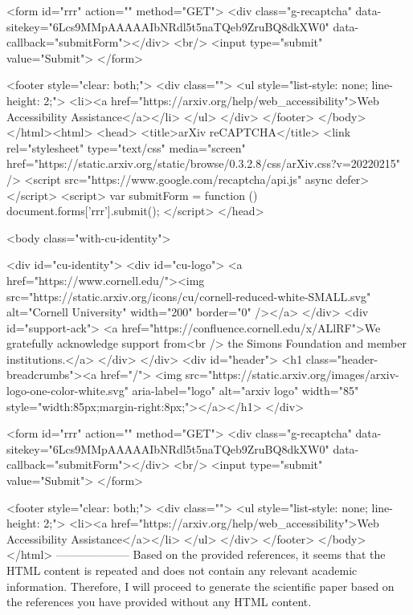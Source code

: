        <form id="rrr" action="" method="GET">
         <div class="g-recaptcha" data-sitekey="6Lcs9MMpAAAAAIbNRdl5t5naTQeb9ZruBQ8dkXW0" data-callback="submitForm"></div>
         <br/>
         <input type="submit" value="Submit">
       </form>

       <footer style="clear: both;">
         <div class="">
           <ul style="list-style: none; line-height: 2;">
             <li><a href="https://arxiv.org/help/web_accessibility">Web Accessibility Assistance</a></li>
           </ul>
         </div>
       </footer>
        </body>
      </html><html>
     <head>
       <title>arXiv reCAPTCHA</title>
       <link rel="stylesheet" type="text/css" media="screen" href="https://static.arxiv.org/static/browse/0.3.2.8/css/arXiv.css?v=20220215" />
       <script src="https://www.google.com/recaptcha/api.js" async defer></script>
       <script>
         var submitForm = function () {
             document.forms['rrr'].submit();
         }
       </script>
     </head>

     <body class="with-cu-identity">

       <div id="cu-identity">
         <div id="cu-logo">
           <a href="https://www.cornell.edu/"><img src="https://static.arxiv.org/icons/cu/cornell-reduced-white-SMALL.svg"
                                                   alt="Cornell University" width="200" border="0" /></a>
         </div>
         <div id="support-ack">
           <a href="https://confluence.cornell.edu/x/ALlRF">We gratefully acknowledge support from<br />
             the Simons Foundation and member institutions.</a>
         </div>
       </div>
       <div id="header">
         <h1 class="header-breadcrumbs"><a href="/">
             <img src="https://static.arxiv.org/images/arxiv-logo-one-color-white.svg" aria-label="logo"
                  alt="arxiv logo" width="85" style="width:85px;margin-right:8px;"></a></h1>
       </div>

       <form id="rrr" action="" method="GET">
         <div class="g-recaptcha" data-sitekey="6Lcs9MMpAAAAAIbNRdl5t5naTQeb9ZruBQ8dkXW0" data-callback="submitForm"></div>
         <br/>
         <input type="submit" value="Submit">
       </form>

       <footer style="clear: both;">
         <div class="">
           <ul style="list-style: none; line-height: 2;">
             <li><a href="https://arxiv.org/help/web_accessibility">Web Accessibility Assistance</a></li>
           </ul>
         </div>
       </footer>
        </body>
      </html>
        --------------------
         Based on the provided references, it seems that the HTML content is repeated and does not contain any relevant academic information. Therefore, I will proceed to generate the scientific paper based on the references you have provided without any HTML content.

